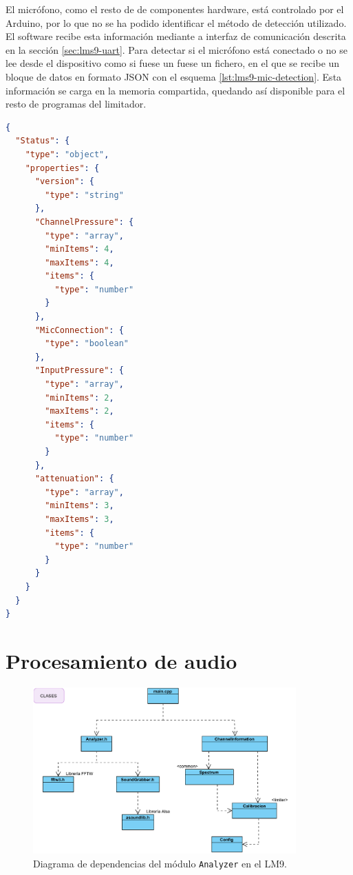El micrófono, como el resto de de componentes hardware, está controlado por el Arduino, por lo que no se ha podido identificar el método de detección utilizado. El software recibe esta información mediante a interfaz de comunicación descrita en la sección \ref{sec:lms9-uart}. Para detectar si el micrófono está conectado o no se lee desde el dispositivo como si fuese un fuese un fichero, en el que se recibe un bloque de datos en formato \acrshort{JSON} con el esquema \ref{lst:lms9-mic-detection}. Esta información se carga en la memoria compartida, quedando así disponible para el resto de programas del limitador. \\

\begin{lstlisting}[language=json, caption={Lectura del estado del micrófono en el \acrshort{LM9}.}, label={lst:lms9-mic-detection}]
{
  "Status": {
    "type": "object",
    "properties": {
      "version": {
        "type": "string"
      },
      "ChannelPressure": {
        "type": "array",
        "minItems": 4,
        "maxItems": 4,
        "items": {
          "type": "number"
        }
      },
      "MicConnection": {
        "type": "boolean"
      },
      "InputPressure": {
        "type": "array",
        "minItems": 2,
        "maxItems": 2,
        "items": {
          "type": "number"
        }
      },
      "attenuation": {
        "type": "array",
        "minItems": 3,
        "maxItems": 3,
        "items": {
          "type": "number"
        }
      }
    }
  }
}
\end{lstlisting}


\section{Procesamiento de audio} \label{sec:lms9-audio}

\begin{figure}[h]
    \centering
    \includegraphics[width=0.9\textwidth]{figuras/lms9-analyzer.pdf}
    \caption{Diagrama de dependencias del módulo \texttt{Analyzer} en el \acrshort{LM9}.}
    \label{fig:lm9-analyzer}
\end{figure}

